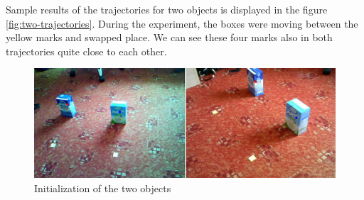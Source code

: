 Sample results of the trajectories for two objects is displayed in the figure
\ref{fig:two-trajectories}. During the experiment, the boxes were moving
between the yellow marks and swapped place. We can see these four marks also in
both trajectories quite close to each other. 

\begin{figure}[p]
\includegraphics[width=\linewidth]{img/experiments/two-objects.png}
\caption{Initialization of the two objects}
\label{fig:two-init}
\end{figure}

